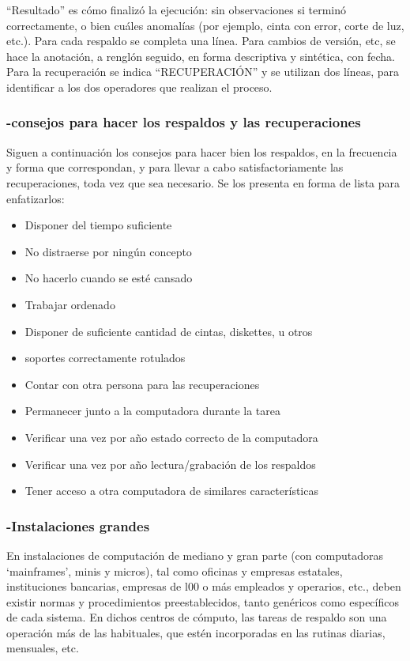 “Resultado” es cómo finalizó la ejecución: sin observaciones si terminó correctamente, o bien cuáles anomalías (por ejemplo, cinta con error, corte de luz, etc.). Para cada respaldo se completa una línea. Para cambios de versión, etc, se hace la anotación, a renglón seguido, en forma descriptiva y sintética, con fecha. Para la recuperación se indica “RECUPERACIÓN” y se utilizan dos líneas, para identificar a los dos operadores que realizan el proceso.


\subsubsection {-consejos para hacer los respaldos y las recuperaciones }
Siguen a continuación los consejos para hacer bien los respaldos, en la frecuencia y forma que correspondan, y para llevar a cabo satisfactoriamente las recuperaciones, toda vez que sea necesario. Se los presenta en forma de lista para enfatizarlos: 
\begin{itemize}
\item{Disponer del tiempo suficiente}
\item{No distraerse por ningún concepto}
\item{No hacerlo cuando se esté cansado}
\item{Trabajar ordenado}
\item{Disponer de suficiente cantidad de cintas, diskettes, u otros }
\item{soportes correctamente rotulados}
\item{Contar con otra persona para las recuperaciones}
\item{Permanecer junto a la computadora durante la  tarea}
\item{Verificar una vez por año estado correcto de la computadora}
\item{Verificar una vez por año lectura/grabación de los respaldos}
\item{Tener acceso a otra computadora de similares características}
\end{itemize}


\subsubsection{-Instalaciones grandes}
En instalaciones de computación de mediano y gran parte (con computadoras ‘mainframes’, minis y micros), tal como oficinas y empresas estatales, instituciones bancarias, empresas de l00 o más empleados y operarios, etc., deben existir normas y procedimientos preestablecidos, tanto genéricos como específicos de cada sistema. En dichos centros de cómputo, las tareas de respaldo son una operación más de las habituales, que estén incorporadas en las rutinas diarias, mensuales, etc.

